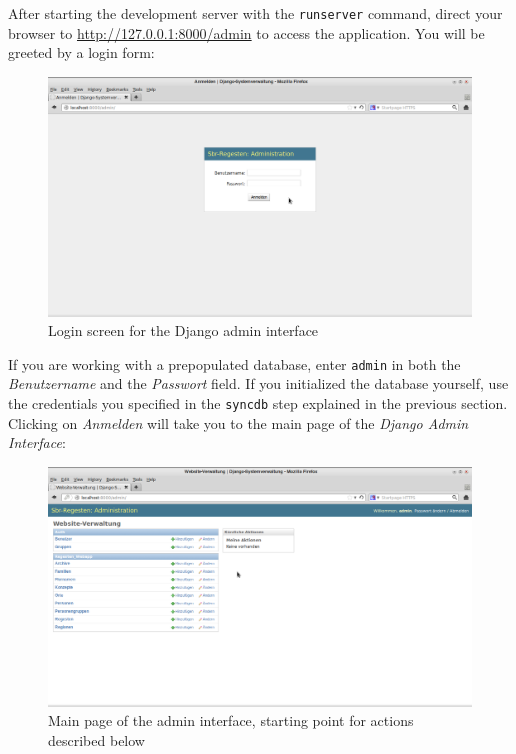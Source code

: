 After starting the development server with the \texttt{runserver}
command, direct your browser to \url{http://127.0.0.1:8000/admin} to
access the application. You will be greeted by a login form:

\begin{figure}[h]
  \centering
  \includegraphics[scale=0.3]{img/admin-login}
  \caption{Login screen for the Django admin interface}
  \label{fig:admin-login}
\end{figure}

If you are working with a prepopulated database, enter \texttt{admin}
in both the \emph{Benutzername} and the \emph{Passwort} field. If you
initialized the database yourself, use the credentials you specified
in the \texttt{syncdb} step explained in the previous section.
Clicking on \emph{Anmelden} will take you to the main page of the
\emph{Django Admin Interface}:

\begin{figure}[h]
  \centering
  \includegraphics[scale=0.3]{img/admin-main}
  \caption{Main page of the admin interface, starting point for actions described below}
  \label{fig:admin-main}
\end{figure}

